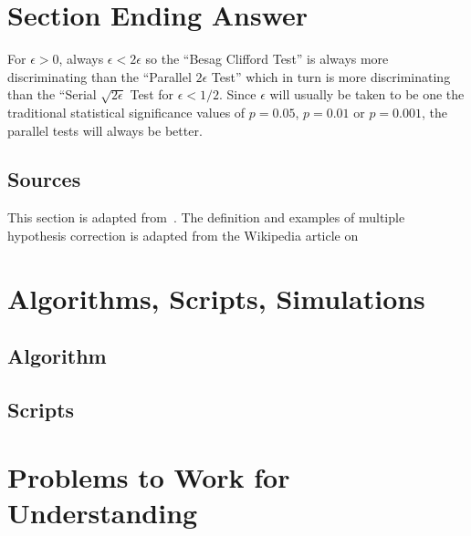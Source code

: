 \documentclass[12pt]{article}
\begin{document}
\section*{Section Ending Answer}
For $\epsilon > 0$, always $\epsilon < 2 \epsilon$ so the
``Besag Clifford Test'' is always more discriminating than the
``Parallel \( 2 \epsilon \) Test'' which in turn is more discriminating than the
``Serial \( \sqrt{2 \epsilon} \) Test for $\epsilon < 1/2$.  Since
$\epsilon$ will usually be taken to be one the traditional statistical
significance values of $p = 0.05$, $p = 0.01$ or $p = 0.001$, the
parallel tests will always be better.

\subsection*{Sources}
This section is adapted from~\cite{doi:10.1080/2330443X.2020.1806763}.  The definition and examples
of multiple hypothesis correction is adapted from the Wikipedia
article on

\hr

\section*{Algorithms, Scripts, Simulations}

\subsection*{Algorithm}

\subsection*{Scripts}



\hr

\section*{Problems to Work for Understanding}
\renewcommand{\theexerciseseries}{}
\renewcommand{\theexercise}{\arabic{exercise}}
\end{document}
